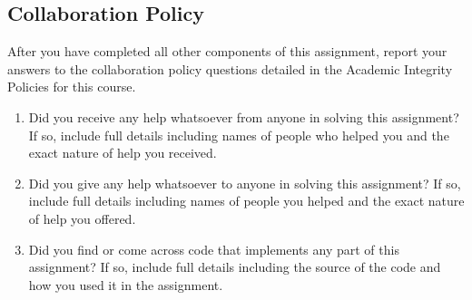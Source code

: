 \documentclass[11pt,addpoints,answers]{exam}
\numberwithin{equation}{section} %
\numberwithin{figure}{section} %
\numberwithin{table}{section} %
\begin{document}
\clearpage
\subsection{Collaboration Policy}

    After you have completed all other components of this assignment, report your answers to the collaboration policy questions detailed in the Academic Integrity Policies for this course.
    \begin{enumerate}
        \item Did you receive any help whatsoever from anyone in solving this assignment? If so, include full details including names of people who helped you and the exact nature of help you received.
        
        \begin{tcolorbox}[fit,height=4cm, width=15cm, blank, borderline={1pt}{-2pt},nobeforeafter]
       \end{tcolorbox}
        \item Did you give any help whatsoever to anyone in solving this assignment? If so, include full details including names of people you helped and the exact nature of help you offered.
        
        \begin{tcolorbox}[fit,height=4cm, width=15cm, blank, borderline={1pt}{-2pt},nobeforeafter]
       \end{tcolorbox}
        \item Did you find or come across code that implements any part of this assignment? If so, include full details including the source of the code and how you used it in the assignment.
        
        \begin{tcolorbox}[fit,height=4cm, width=15cm, blank, borderline={1pt}{-2pt},nobeforeafter]
       \end{tcolorbox}
    \end{enumerate}\clearpage
\end{document}
